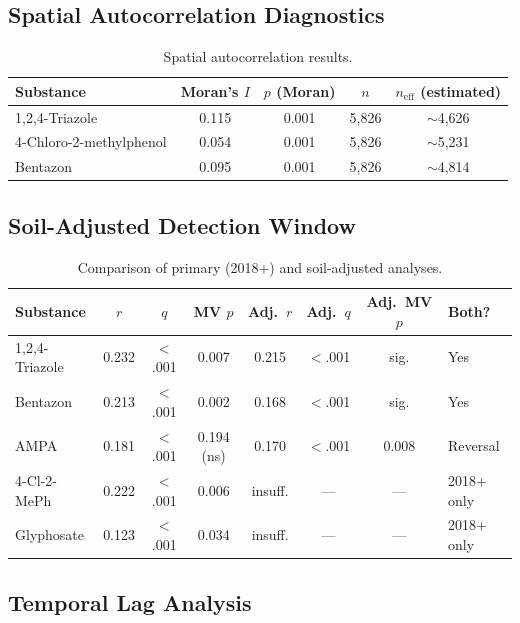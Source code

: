 \documentclass[12pt,a4paper]{article}
\begin{document}
\subsection{Spatial Autocorrelation Diagnostics}

\begin{table}[H]
\centering
\caption{Spatial autocorrelation results.}
\begin{tabular}{@{}lcccc@{}}
\toprule
Substance & Moran's $I$ & $p$ (Moran) & $n$ & $n_{\text{eff}}$ (estimated) \\
\midrule
1,2,4-Triazole & 0.115 & 0.001 & 5,826 & $\sim$4,626 \\
4-Chloro-2-methylphenol & 0.054 & 0.001 & 5,826 & $\sim$5,231 \\
Bentazon & 0.095 & 0.001 & 5,826 & $\sim$4,814 \\
\bottomrule
\end{tabular}
\end{table}

\subsection{Soil-Adjusted Detection Window}

\begin{table}[H]
\centering
\caption{Comparison of primary (2018+) and soil-adjusted analyses.}
\scriptsize
\begin{tabular}{@{}lccccccl@{}}
\toprule
Substance & $r$ & $q$ & MV $p$ & Adj.\ $r$ & Adj.\ $q$ & Adj.\ MV $p$ & Both? \\
\midrule
1,2,4-Triazole & 0.232 & $<$.001 & 0.007 & 0.215 & $<$.001 & sig. & Yes \\
Bentazon & 0.213 & $<$.001 & 0.002 & 0.168 & $<$.001 & sig. & Yes \\
AMPA & 0.181 & $<$.001 & 0.194 (ns) & 0.170 & $<$.001 & 0.008 & Reversal \\
4-Cl-2-MePh & 0.222 & $<$.001 & 0.006 & insuff. & --- & --- & 2018+ only \\
Glyphosate & 0.123 & $<$.001 & 0.034 & insuff. & --- & --- & 2018+ only \\
\bottomrule
\end{tabular}
\end{table}

\subsection{Temporal Lag Analysis}
\end{document}

